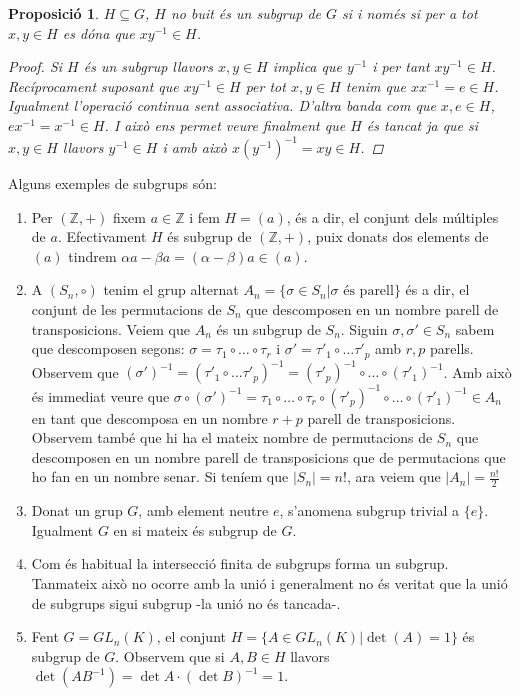 \documentclass[a4paper,11pt]{report}
\newcommand{\inv}[1]{#1^{-1}}
\theoremstyle{theorem}
\newtheorem{proposicio}{\normalfont \sffamily\bfseries Proposició}[section]
\theoremstyle{definition}
\begin{document}
\begin{proposicio}
	$H\subseteq G$, $H$ no buit és un subgrup de $G$ si i només si per a tot $x,y\in H$ es dóna que $x\inv{y}\in H$.
	\begin{proof}
		Si $H$ és un subgrup llavors $x,y\in H$ implica que $\inv{y}$ i per tant $x\inv{y}\in H$.
		Recíprocament suposant que $x\inv{y}\in H$ per tot $x,y\in H$ tenim que $x\inv{x}=e\in H$. Igualment l'operació continua sent associativa. D'altra banda com que $x,e\in H$, $e\inv{x}=\inv{x}\in H$. I això ens permet veure finalment que $H$ és tancat ja que si $x,y \in H$ llavors $\inv{y}\in H$ i amb això $x(\inv{y})^{-1}=xy\in H$. 
	\end{proof}
\end{proposicio}
Alguns exemples de subgrups són:
\begin{enumerate}
\item  Per $(\mathbb{Z,+})$ fixem $a\in\mathbb{Z}$ i fem $H=(a)$, és a dir, el conjunt dels múltiples de $a$. Efectivament $H$ és subgrup de $(\mathbb{Z,+})$, puix donats dos elements de $(a)$ tindrem $\alpha a-\beta a=(\alpha -\beta) a\in (a)$.
\item A $(S_n,\circ)$ tenim el grup alternat $A_n=\{\sigma\in S_n| \sigma \text{ és parell}\}$ és a dir, el conjunt de les permutacions de $S_n$ que descomposen en un nombre parell de transposicions. Veiem que $A_n$ és un subgrup de $S_n$. Siguin $\sigma,\sigma'\in S_n$ sabem que descomposen segons: $\sigma=\tau_1\circ\ldots\circ\tau_r$ i $\sigma'=\tau'_1\circ\ldots\tau'_p$ amb $r,p$ parells.
Observem que $\inv{(\sigma')}=\inv{(\tau'_1\circ\ldots\tau'_p)}=\inv{(\tau'_p)}\circ\ldots\circ\inv{(\tau'_1)}$. Amb això és immediat veure que $\sigma\circ(\sigma')^{-1}=\tau_1\circ\ldots\circ\tau_r\circ\inv{(\tau'_p)}\circ\ldots\circ\inv{(\tau'_1)}\in A_n$ en tant que descomposa en un nombre $r+p$ parell de transposicions. Observem també que hi ha el mateix nombre de permutacions de $S_n$ que descomposen en un nombre parell de transposicions que de permutacions que ho fan en un nombre senar. Si teníem que $|S_n|=n!$, ara veiem que $|A_n|=\tfrac{n!}{2}$
\item Donat un grup $G$, amb element neutre $e$, s'anomena subgrup trivial a $\{e\}$. Igualment $G$ en si mateix és subgrup de $G$.
\item Com és habitual la intersecció finita de subgrups forma un subgrup. Tanmateix això no ocorre amb la unió i generalment no és veritat que la unió de subgrups sigui subgrup -la unió no és tancada-.
\item Fent $G=GL_n(K)$, el conjunt $H=\{A\in GL_n(K)|\det(A)=1\}$ és subgrup de $G$. Observem que si $A,B\in H$ llavors $\det(A\inv{B})=\det A\cdot \inv{(\det B)}=1$.
\end{enumerate}
\end{document}
